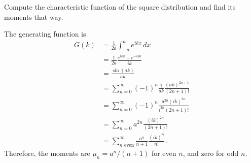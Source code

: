 

Compute the characteristic function of the square distribution and find its moments that way.


The generating function is
\begin{align*}
G(k)
&= \frac{1}{2a} \int_{-a}^a e^{ikx} \, dx \\
&= \frac{1}{2a} \frac{e^{ika} - e^{-ika}}{ik} \\
&= \frac{\sin(ak)}{ak} \\
&= \sum_{n=0}^\infty (-1)^n \frac{1}{ak} \frac{(ak)^{2n+1}}{(2n+1)!} \\
&= \sum_{n=0}^\infty (-1)^n \frac{a^{2n} (ik)^{2n}}{i^{2n}(2n+1)!} \\
&= \sum_{n=0}^\infty a^{2n} \frac{(ik)^{2n}}{(2n+1)!} \\
&= \sum_{n \text{ even}}^\infty \frac{a^n}{n+1} \frac{(ik)^n}{n!} \, .
\end{align*}
Therefore, the moments are $\mu_n = a^n / (n+1)$ for even $n$, and zero for odd $n$.
